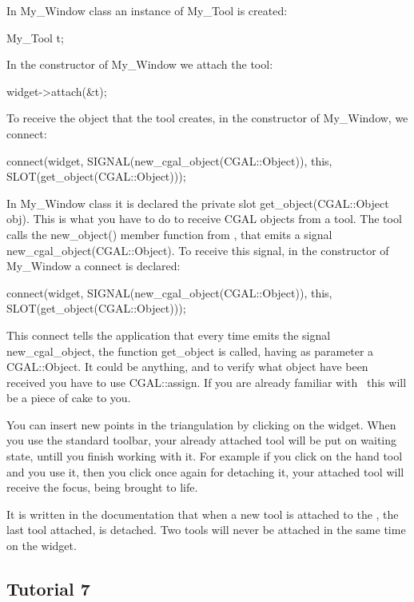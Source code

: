 In My\_Window class an instance of My\_Tool is created:
\begin{ccExampleCode}
My_Tool	t;
\end{ccExampleCode}
In the constructor of My\_Window we attach the tool:
\begin{ccExampleCode}
widget->attach(&t);
\end{ccExampleCode}

To receive the object that the tool creates, in the constructor of My\_Window, 
we connect:
\begin{ccExampleCode}
connect(widget, SIGNAL(new_cgal_object(CGAL::Object)), 
            this, SLOT(get_object(CGAL::Object)));
\end{ccExampleCode}
In My\_Window class it is declared the private slot get\_object(CGAL::Object obj). 
This is what you have to do to receive CGAL objects from a tool. The
tool calls the new\_object() member function from , that emits
a signal new\_cgal\_object(CGAL::Object). To receive this signal, in the
constructor of My\_Window a connect is declared:
\begin{ccExampleCode}
connect(widget, SIGNAL(new\_cgal\_object(CGAL::Object)), 
             this, SLOT(get\_object(CGAL::Object)));
\end{ccExampleCode}

This connect tells the application that every time  emits the
signal new\_cgal\_object, the function get\_object is called, having as
parameter a CGAL::Object. It could be anything, and to verify what
object have been received you have to use CGAL::assign. If you are
already familiar with \cgal\ this will be a piece of cake to you.

You can insert new points in the triangulation by clicking on the
widget. When you use the standard toolbar, your already attached tool
will be put on waiting state, untill you finish working with it. For
example if you click on the hand tool and you use it, then you click
once again for detaching it, your attached tool will receive the
focus, being brought to life.

It is written in the documentation that when a new tool is attached to the
, the last tool attached, is detached. Two tools will
never be attached in the same time on the widget.

\subsection*{Tutorial 7}

